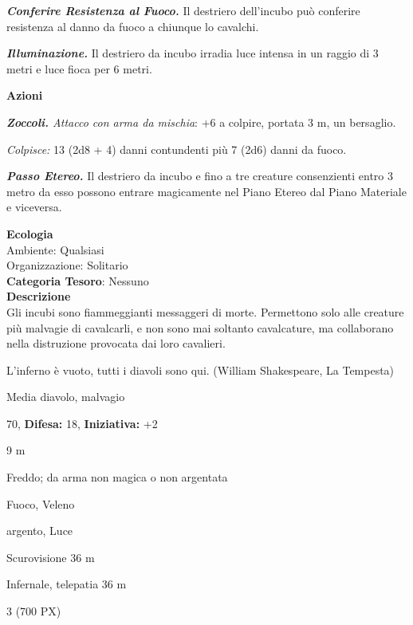 \begin{multicols}{2}
{\emph{\textbf{Conferire Resistenza al Fuoco.}} Il destriero dell'incubo può conferire resistenza al danno da fuoco a chiunque lo cavalchi.

\emph{\textbf{Illuminazione.}} Il destriero da incubo irradia luce intensa in un raggio di 3 metri e luce fioca per 6 metri.

\textbf{Azioni}

\emph{\textbf{Zoccoli.} Attacco con arma da mischia}: +6 a colpire, portata 3 m, un bersaglio.

\emph{Colpisce:} 13 (2d8 + 4) danni contundenti più 7 (2d6) danni da fuoco.

\emph{\textbf{Passo Etereo.}} Il destriero da incubo e fino a tre creature consenzienti entro 3 metro da esso possono entrare magicamente nel Piano Etereo dal Piano Materiale e viceversa.

\textbf{Ecologia}\\
Ambiente: Qualsiasi\\
Organizzazione: Solitario\\
\textbf{Categoria Tesoro}: Nessuno\\
\textbf{Descrizione}\\
Gli incubi sono fiammeggianti messaggeri di morte. Permettono solo alle creature più malvagie di cavalcarli, e non sono mai soltanto cavalcature, ma collaborano nella distruzione provocata dai loro cavalieri.

\begin{enfasi}{L'inferno è vuoto, tutti i diavoli sono qui. (William Shakespeare, La Tempesta)}\end{enfasi}

\noindent
\begin{description}[noitemsep, topsep=0pt, parsep=0pt, partopsep=0pt, leftmargin=0cm, labelwidth=2.2cm]
	\item[\textbf{Taglia/Tipo:}] Media diavolo, malvagio
	\item[\textbf{Caratt.:}] 
	\item[\textbf{Punti Ferita:}] 70,  \textbf{Difesa:} 18,  \textbf{Iniziativa:} +2
	\item[\textbf{Movimento:}] 9 m
	\item[\textbf{Tiri Salvez.:}] 
	\item[\textbf{Res. Danni:}] Freddo; da arma non magica o non argentata
	\item[\textbf{Imm. Danni:}] Fuoco, Veleno
	\item[\textbf{Vulnerabilità:}] argento, Luce
	\item[\textbf{Sensi:}] Scurovisione 36 m
	\item[\textbf{Linguaggi:}] Infernale, telepatia 36 m
	\item[\textbf{Sfida:}] 3 (700 PX)\smallskip
\end{description}

}
\end{multicols}
